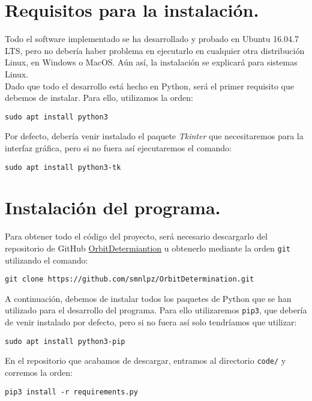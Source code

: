 \section{Requisitos para la instalación.}
Todo el software implementado se ha desarrollado y probado en Ubuntu 16.04.7 LTS, pero no debería haber problema en ejecutarlo en cualquier otra distribución Linux, en Windows o MacOS. Aún así, la instalación se explicará para sistemas Linux.\\

Dado que todo el desarrollo está hecho en Python, será el primer requisito que debemos de instalar. Para ello, utilizamos la orden:
\begin{lstlisting}[style=Console]
sudo apt install python3
\end{lstlisting}

Por defecto, debería venir instalado el paquete \textit{Tkinter} que necesitaremos para la interfaz gráfica, pero si no fuera así ejecutaremos el comando:
\begin{lstlisting}[style=Console]
sudo apt install python3-tk
\end{lstlisting}

\section{Instalación del programa.}
Para obtener todo el código del proyecto, será necesario descargarlo del repositorio de GitHub \href{https://github.com/smnlpz/OrbitDetermination}{OrbitDetermiantion} u obtenerlo mediante la orden \texttt{git} utilizando el comando:
\begin{lstlisting}[style=Console]
git clone https://github.com/smnlpz/OrbitDetermination.git
\end{lstlisting}

A continuación, debemos de instalar todos los paquetes de Python que se han utilizado para el desarrollo del programa. Para ello utilizaremos \texttt{pip3}, que debería de venir instalado por defecto, pero si no fuera así solo tendríamos que utilizar:
\begin{lstlisting}[style=Console]
sudo apt install python3-pip
\end{lstlisting}

En el repositorio que acabamos de descargar, entramos al directorio \texttt{code/} y corremos la orden:
\begin{lstlisting}[style=Console]
pip3 install -r requirements.py
\end{lstlisting}

